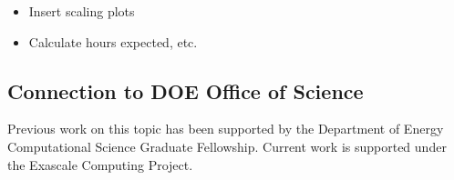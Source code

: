 \documentclass[onecolumn, 12pt]{report}
\begin{document}
\begin{itemize}
	\item Insert scaling plots
	\item Calculate hours expected, etc.
\end{itemize}
\subsection{Connection to DOE Office of Science}
Previous work on this topic has been supported by the Department of Energy Computational Science Graduate Fellowship. Current work is supported under the Exascale Computing Project.
\end{document}
